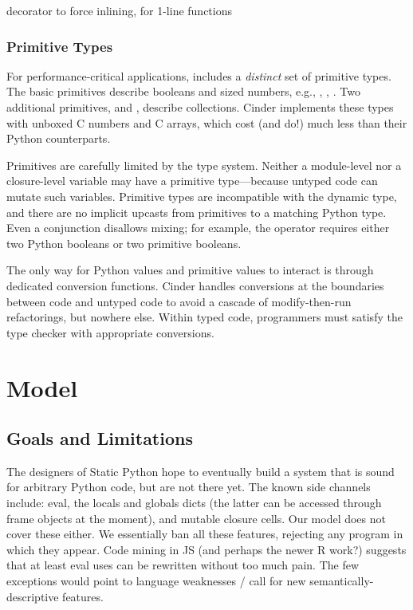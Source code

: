 \documentclass[a4paper,english,cleveref,autoref,thm-restate,anonymous,]{lipics-v2021}
\begin{document}
decorator to force inlining, for 1-line functions


\subsubsection{Primitive Types}

For performance-critical applications, \SP{} includes a \emph{distinct} set of primitive types.
The basic primitives describe booleans and sized numbers, e.g., , , .
Two additional primitives,  and , describe collections.
Cinder implements these types with unboxed C numbers and C arrays, which cost
(and do!) much less than their Python counterparts.


Primitives are carefully limited by the type system.
Neither a module-level nor a closure-level variable may have a primitive
type---because untyped code can mutate such variables.
Primitive types are incompatible with the dynamic type,
and there are no implicit upcasts from primitives
to a matching Python type.
Even a conjunction disallows mixing; for example, the  operator
requires either two Python booleans or two primitive booleans.

The only way for Python values and primitive values to interact
is through dedicated conversion functions.
Cinder handles conversions at the boundaries between \SP{} code
and untyped code to avoid a cascade of modify-then-run refactorings, but nowhere else.
Within typed code, programmers must satisfy the type checker with
appropriate conversions.





\section{Model}
\label{s:model}


\subsection{Goals and Limitations}

The designers of Static Python hope to eventually build a system that is sound for arbitrary Python code,
but are not there yet.
The known side channels include:
eval, the locals and globals dicts (the latter can be accessed through frame objects at the moment),
and mutable closure cells.
Our model does not cover these either.
We essentially ban all these features, rejecting any program in which they appear.
Code mining in JS (and perhaps the newer R work?) suggests that at least eval
uses can be rewritten without too much pain. The few exceptions would point
to language weaknesses / call for new semantically-descriptive features.
\end{document}
